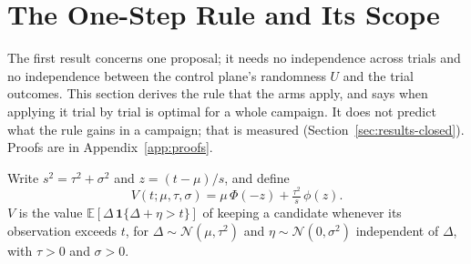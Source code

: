 \section{The One-Step Rule and Its Scope}
\label{sec:theory}


The first result concerns one proposal; it needs no independence across trials and no independence between the control plane's randomness $U$ and the trial outcomes. This section derives the rule that the arms apply, and says when applying it trial by trial is optimal for a whole campaign. It does not predict what the rule gains in a campaign; that is measured (Section~\ref{sec:results-closed}). Proofs are in Appendix~\ref{app:proofs}.

Write $s^2=\tau^2+\sigma^2$ and $z=(t-\mu)/s$, and define
\[
V(t;\mu,\tau,\sigma)=\mu\,\Phi(-z)+\tfrac{\tau^2}{s}\,\phi(z).
\]
$V$ is the value $\mathbb{E}[\Delta\,\mathbf{1}\{\Delta+\eta>t\}]$ of keeping a candidate whenever its observation exceeds $t$, for $\Delta\sim\mathcal{N}(\mu,\tau^2)$ and $\eta\sim\mathcal{N}(0,\sigma^2)$ independent of $\Delta$, with $\tau>0$ and $\sigma>0$.

